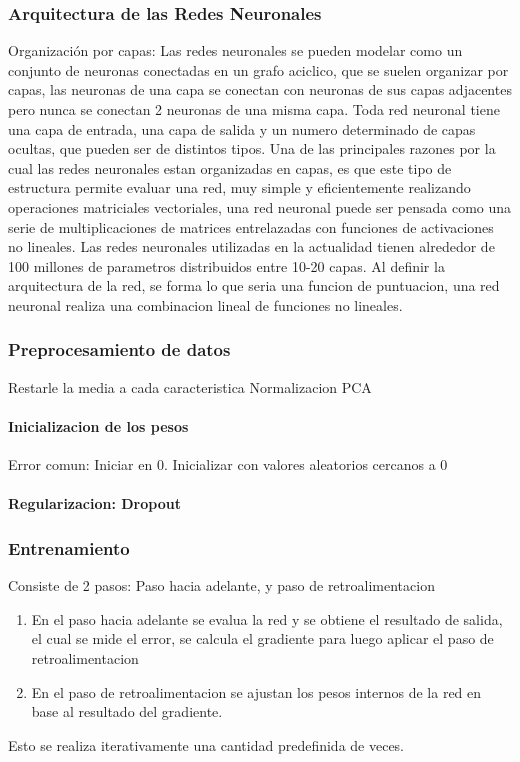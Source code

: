 \documentclass[a4paper,10pt]{article}
\begin{document}
    \subsubsection {Arquitectura de las Redes Neuronales}
      Organización por capas: Las redes neuronales se pueden modelar como un conjunto de neuronas conectadas en un grafo aciclico, que se suelen organizar por capas, las neuronas de una capa
      se conectan con neuronas de sus capas adjacentes pero nunca se conectan 2 neuronas de una misma capa.
      Toda red neuronal tiene una capa de entrada, una capa de salida y un numero determinado de capas ocultas, que pueden ser de distintos tipos.
      Una de las principales razones por la cual las redes neuronales estan organizadas en capas, es que este tipo de estructura permite evaluar una red, muy simple y eficientemente realizando
      operaciones matriciales vectoriales, una red neuronal puede ser pensada como una serie de multiplicaciones de matrices entrelazadas con funciones de activaciones no lineales.
      Las redes neuronales utilizadas en la actualidad tienen alrededor de 100 millones de parametros distribuidos entre 10-20 capas.
      Al definir la arquitectura de la red, se forma lo que seria una funcion de puntuacion, una red neuronal realiza una combinacion lineal de funciones no lineales. 

    \subsubsection {Preprocesamiento de datos}
	Restarle la media a cada caracteristica
	Normalizacion
	PCA

    \paragraph {Inicializacion de los pesos}
      Error comun: Iniciar en 0.
      Inicializar con valores aleatorios cercanos a 0 

    \paragraph {Regularizacion: Dropout}


    \subsubsection {Entrenamiento}
      Consiste de 2 pasos: Paso hacia adelante, y paso de retroalimentacion
      \begin{enumerate}
      \item En el paso hacia adelante se evalua la red y se obtiene el resultado de salida, el cual se mide el error, se calcula el gradiente para luego aplicar el paso de retroalimentacion
	\item En el paso de retroalimentacion se ajustan los pesos internos de la red en base al resultado del gradiente.
      \end{enumerate}
      Esto se realiza iterativamente una cantidad predefinida de veces.
\end{document}
